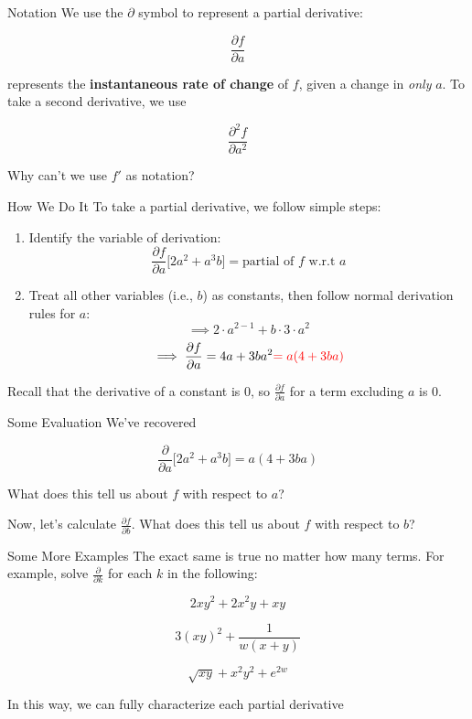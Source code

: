 \documentclass[10pt]{beamer}
\begin{document}
\begin{frame}{Notation}
    We use the $\partial$ symbol to represent a partial derivative:

    \[\frac{\partial f}{\partial a}\]
    
    represents the \textbf{instantaneous rate of change} of $f$, given a change in \textit{only} $a$. To take a second derivative, we use

    \[\frac{\partial ^2 f}{\partial a^2}\]

    Why can't we use $f'$ as notation?
\end{frame}

\begin{frame}{How We Do It}
    To take a partial derivative, we follow simple steps:

    \begin{enumerate}
        \item Identify the variable of derivation:
        \[\frac{\partial f}{\partial a} \bigg[2a^2 + a^3b\bigg]= \text{partial of $f$ w.r.t $a$}\]
        \item Treat all other variables (i.e., $b$) as constants, then follow normal derivation rules for $a$: \pause
        \[\implies2 \cdot a^{2-1} +  b \cdot 3 \cdot a^2\]
        \[\implies \frac{\partial f}{\partial a} = 4a + 3ba^2 \textcolor{red}{= a(4 + 3ba)}\]
    \end{enumerate}

    Recall that the derivative of a constant is $0$, so $\frac{\partial f}{\partial a}$ for a term excluding $a$ is $0$.
\end{frame}

\begin{frame}{Some Evaluation}
    We've recovered

    \[\frac{\partial}{\partial a} \bigg[ 2a^2 + a^3b\bigg] = a(4 + 3ba)\]

    What does this tell us about $f$ with respect to $a$? \\

    \vspace{1cm}
    \pause

    Now, let's calculate $\frac{\partial f}{\partial b}$. What does this tell us about $f$ with respect to $b$?
\end{frame}

\begin{frame}{Some More Examples}
    The exact same is true no matter how many terms. For example, solve $\frac{\partial}{\partial k}$ for each $k$ in the following:

    \[ 2xy^2 + 2x^2y + xy\]

    \[3(xy)^2 + \frac{1}{w(x+y)}\]

    \[\sqrt{xy} + x^2 y^2 + e^{2w}\]

    In this way, we can fully characterize each partial derivative
\end{frame}
\end{document}
